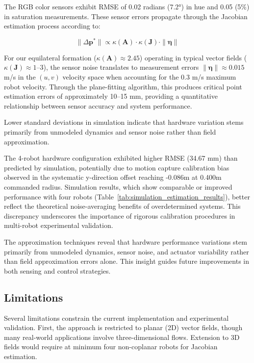 \documentclass[lettersize,journal]{IEEEtran}
\begin{document}
The RGB color sensors exhibit RMSE of 0.02 radians (7.2°) in hue and 0.05 (5\%) in saturation measurements. These sensor errors propagate through the Jacobian estimation process according to:

\begin{equation}
\|\Delta\mathbf{p}^*\| \propto \kappa(\mathbf{A}) \cdot \kappa(\mathbf{J}) \cdot \|\boldsymbol{\eta}\|
\end{equation}

For our equilateral formation ($\kappa(\mathbf{A}) \approx 2.45$) operating in typical vector fields ($\kappa(\mathbf{J}) \approx 1$--$3$), the sensor noise translates to measurement errors $\|\boldsymbol{\eta}\| \approx 0.015$ m/s in the $(u,v)$ velocity space when accounting for the 0.3 m/s maximum robot velocity. Through the plane-fitting algorithm, this produces critical point estimation errors of approximately 10--15 mm, providing a quantitative relationship between sensor accuracy and system performance.

Lower standard deviations in simulation indicate that hardware variation stems primarily from unmodeled dynamics and sensor noise rather than field approximation.

The 4-robot hardware configuration exhibited higher RMSE (34.67 mm) than predicted by simulation, potentially due to motion capture calibration bias observed in the systematic y-direction offset reaching -0.086m at 0.400m commanded radius. Simulation results, which show comparable or improved performance with four robots (Table~\ref{tab:simulation_estimation_results}), better reflect the theoretical noise-averaging benefits of overdetermined systems. This discrepancy underscores the importance of rigorous calibration procedures in multi-robot experimental validation.

The approximation techniques reveal that hardware performance variations stem primarily from unmodeled dynamics, sensor noise, and actuator variability rather than field approximation errors alone. This insight guides future improvements in both sensing and control strategies.




\subsection{Limitations}

Several limitations constrain the current implementation and experimental validation. First, the approach is restricted to planar (2D) vector fields, though many real-world applications involve three-dimensional flows. Extension to 3D fields would require at minimum four non-coplanar robots for Jacobian estimation.
\end{document}
